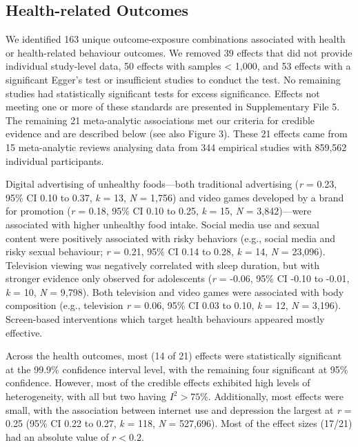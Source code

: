 \documentclass[
  english,
  man]{apa6}
\begin{document}
\hypertarget{health-related-outcomes}{%
\subsection{Health-related Outcomes}\label{health-related-outcomes}}

We identified 163 unique outcome-exposure combinations associated with health or health-related behaviour outcomes.
We removed 39 effects that did not provide individual study-level data, 50 effects with samples \textless{} 1,000, and 53 effects with a significant Egger's test or insufficient studies to conduct the test.
No remaining studies had statistically significant tests for excess significance.
Effects not meeting one or more of these standards are presented in Supplementary File 5.
The remaining 21 meta-analytic associations met our criteria for credible evidence and are described below (see also Figure 3).
These 21 effects came from 15 meta-analytic reviews analysing data from 344 empirical studies with 859,562 individual participants.

Digital advertising of unhealthy foods---both traditional advertising (\emph{r} = 0.23, 95\% CI 0.10 to 0.37, \emph{k} = 13, \emph{N} = 1,756) and video games developed by a brand for promotion (\emph{r} = 0.18, 95\% CI 0.10 to 0.25, \emph{k} = 15, \emph{N} = 3,842)---were associated with higher unhealthy food intake.
Social media use and sexual content were positively associated with risky behaviors (e.g., social media and risky sexual behaviour; \emph{r} = 0.21, 95\% CI 0.14 to 0.28, \emph{k} = 14, \emph{N} = 23,096).
Television viewing was negatively correlated with sleep duration, but with stronger evidence only observed for adolescents (\emph{r} = -0.06, 95\% CI -0.10 to -0.01, \emph{k} = 10, \emph{N} = 9,798).
Both television and video games were associated with body composition (e.g., television \emph{r} = 0.06, 95\% CI 0.03 to 0.10, \emph{k} = 12, \emph{N} = 3,196).
Screen-based interventions which target health behaviours appeared mostly effective.

Across the health outcomes, most (14 of 21) effects were statistically significant at the 99.9\% confidence interval level, with the remaining four significant at 95\% confidence.
However, most of the credible effects exhibited high levels of heterogeneity, with all but two having \(I^2 > 75\%\).
Additionally, most effects were small, with the association between internet use and depression the largest at \emph{r} = 0.25 (95\% CI 0.22 to 0.27, \emph{k} = 118, \emph{N} = 527,696).
Most of the effect sizes (17/21) had an absolute value of \(r < 0.2\).
\end{document}
